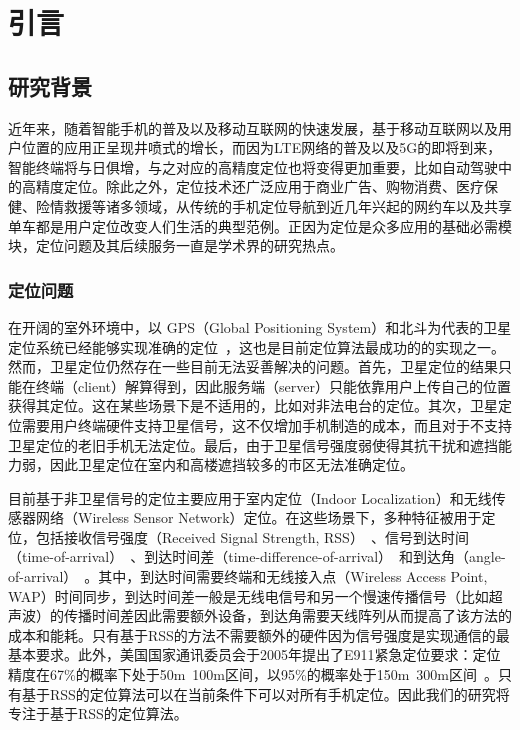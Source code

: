 \chapter{引言}
\label{cha:intro}

\section{研究背景}
近年来，随着智能手机的普及以及移动互联网的快速发展，基于移动互联网以及用户位置的应用正呈现井喷式的增长，而因为LTE网络的普及以及5G的即将到来，智能终端将与日俱增，与之对应的高精度定位也将变得更加重要，比如自动驾驶中的高精度定位。除此之外，定位技术还广泛应用于商业广告、购物消费、医疗保健、险情救援等诸多领域，从传统的手机定位导航到近几年兴起的网约车以及共享单车都是用户定位改变人们生活的典型范例。正因为定位是众多应用的基础必需模块，定位问题及其后续服务一直是学术界的研究热点。

\subsection{定位问题}

在开阔的室外环境中，以 GPS（Global  Positioning System）和北斗为代表的卫星定位系统已经能够实现准确的定位~\cite{xiao2016survey}，这也是目前定位算法最成功的的实现之一。然而，卫星定位仍然存在一些目前无法妥善解决的问题。首先，卫星定位的结果只能在终端（client）解算得到，因此服务端（server）只能依靠用户上传自己的位置获得其定位。这在某些场景下是不适用的，比如对非法电台的定位。其次，卫星定位需要用户终端硬件支持卫星信号，这不仅增加手机制造的成本，而且对于不支持卫星定位的老旧手机无法定位。最后，由于卫星信号强度弱使得其抗干扰和遮挡能力弱，因此卫星定位在室内和高楼遮挡较多的市区无法准确定位。

目前基于非卫星信号的定位主要应用于室内定位（Indoor Localization）和无线传感器网络（Wireless Sensor Network）定位。在这些场景下，多种特征被用于定位，包括接收信号强度（Received Signal Strength, RSS）~\cite{vaghefi2013cooperative, jackson2011received, liu2006analysis, bahl2000radar}、信号到达时间（time-of-arrival）~\cite{guvenc2009survey}、到达时间差（time-difference-of-arrival）~\cite{catovic2004cramer}和到达角（angle-of-arrival）~\cite{cong2002hybrid}。其中，到达时间需要终端和无线接入点（Wireless Access Point, WAP）时间同步，到达时间差一般是无线电信号和另一个慢速传播信号（比如超声波）的传播时间差因此需要额外设备，到达角需要天线阵列从而提高了该方法的成本和能耗。只有基于RSS的方法不需要额外的硬件因为信号强度是实现通信的最基本要求。此外，美国国家通讯委员会于2005年提出了E911紧急定位要求：定位精度在67\%的概率下处于50m~100m区间，以95\%的概率处于150m~300m区间~\cite{junglas2008location}。只有基于RSS的定位算法可以在当前条件下可以对所有手机定位。因此我们的研究将专注于基于RSS的定位算法。


